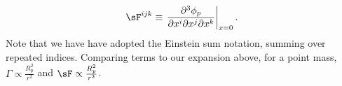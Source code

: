 \begin{equation}
\sF^{ijk} \equiv  \left. \frac{\partial^3 \phi_p}{\partial x^i \partial x^j \partial x^k} \right|_{x=0}.
\end{equation}
Note that we have have adopted the Einstein sum notation, summing over repeated indices. Comparing terms to our expansion above, for a point mass,
$\Gamma \propto \frac{R_p^2}{r^2}$ and $\sF \propto \frac{R_p^2}{r^3}$. 